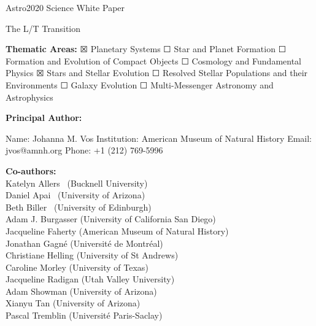 \documentclass[12pt]{article}
\begin{document}
\setlength{\textfloatsep}{8pt plus 1.0pt minus 2.0pt}


\raggedright
\huge
Astro2020 Science White Paper \linebreak

The L/T Transition \linebreak
\normalsize

\noindent \textbf{Thematic Areas:} \hspace*{55pt} $\XBox$ Planetary Systems \hspace*{14pt} $\Square$ Star and Planet Formation \hspace*{20pt}\linebreak
$\Square$ Formation and Evolution of Compact Objects \hspace*{31pt} $\Square$ Cosmology and Fundamental Physics \linebreak
  $\XBox$  Stars and Stellar Evolution \hspace*{1pt} $\Square$ Resolved Stellar Populations and their Environments \hspace*{40pt} \linebreak
  $\Square$    Galaxy Evolution   \hspace*{45pt} $\Square$             Multi-Messenger Astronomy and Astrophysics \hspace*{65pt} \linebreak
  
\textbf{Principal Author:}

Name:	Johanna M. Vos
 \linebreak						
Institution:  American Museum of Natural History
 \linebreak
Email: jvos@amnh.org
 \linebreak
Phone:  +1 (212) 769-5996
 \linebreak
 
\textbf{Co-authors:}  \\
Katelyn Allers ~(Bucknell University)\\
Daniel Apai ~(University of Arizona)\\
Beth  Biller ~(University of Edinburgh)\\
Adam J. Burgasser (University of California San Diego)\\
Jacqueline Faherty (American Museum of Natural History)\\
Jonathan Gagn\'e (Universit\'e de Montr\'eal) \\
Christiane Helling (University of St Andrews)\\
Caroline Morley (University of Texas)\\
Jacqueline Radigan (Utah Valley University)\\
Adam Showman (University of Arizona)\\
Xianyu Tan (University of Arizona) \\
Pascal Tremblin (Universit\'e Paris-Saclay)
\linebreak
\end{document}

